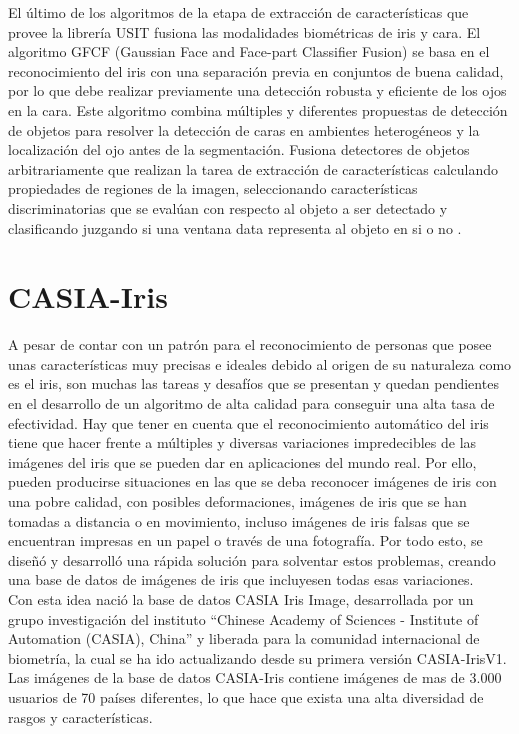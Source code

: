El último de los algoritmos de la etapa de extracción de características que provee la librería USIT fusiona las modalidades biométricas de iris y cara.  El algoritmo GFCF (Gaussian Face and Face-part Classifier Fusion) se basa en el reconocimiento del iris con una separación previa en conjuntos de buena calidad, por lo que debe realizar previamente una detección robusta y eficiente de los ojos en la cara. Este algoritmo combina múltiples y diferentes propuestas de detección de objetos para resolver la detección de caras en ambientes heterogéneos y la localización del ojo antes de la segmentación. Fusiona detectores de objetos arbitrariamente que realizan la tarea de extracción de características calculando propiedades de regiones de la imagen, seleccionando características discriminatorias que se evalúan con respecto al objeto a ser detectado y clasificando juzgando si una ventana data representa al objeto en si o no \cite{Reference18} \cite{Reference19}. \\




\section{CASIA-Iris}

A pesar de contar con un patrón para el reconocimiento de personas que posee unas características muy precisas e ideales debido al origen de su naturaleza como es el iris, son muchas las tareas y desafíos que se presentan y quedan pendientes en el desarrollo de un algoritmo de alta calidad para conseguir una alta tasa de efectividad. Hay que tener en cuenta que el reconocimiento automático del iris tiene que hacer frente a múltiples y diversas variaciones impredecibles de las imágenes del iris que se pueden dar en aplicaciones del mundo real. Por ello, pueden producirse situaciones en las que se deba reconocer imágenes de iris con una pobre calidad, con posibles deformaciones, imágenes de iris que se han tomadas a distancia o en movimiento, incluso imágenes de iris falsas que se encuentran impresas en un papel o través de una fotografía. Por todo esto, se diseñó y desarrolló una rápida solución para solventar estos problemas, creando una base de datos de imágenes de iris que incluyesen todas esas variaciones. \\

Con esta idea nació la base de datos CASIA Iris Image, desarrollada por un grupo investigación del instituto “Chinese Academy of Sciences - Institute of Automation (CASIA), China” y liberada para la comunidad internacional de biometría, la cual se ha ido actualizando desde su primera versión CASIA-IrisV1. Las imágenes de la base de datos CASIA-Iris contiene imágenes de mas de 3.000 usuarios de 70 países diferentes, lo que hace que exista una alta diversidad de rasgos y características. \\

